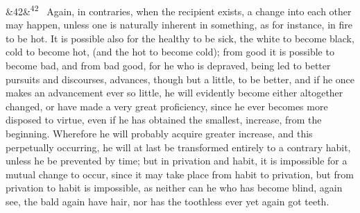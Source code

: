 \documentclass[12pt]{article}
\newcommand{\para}[1][]{\par\noindent\ifx&#1&\else\textsuperscript{\footnotesize #1}~\fi}
\begin{document}
\para[42] Again, in contraries, when the recipient exists, a change into each other may happen, unless one is naturally inherent in something, as for instance, in fire to be hot. It is possible also for the healthy to be sick, the white to become black, cold to become hot, (and the hot to become cold); from good it is possible to become bad, and from bad good, for he who is depraved, being led to better pursuits and discourses, advances, though but a little, to be better, and if he once makes an advancement ever so little, he will evidently become either altogether changed, or have made a very great proficiency, since he ever becomes more disposed to virtue, even if he has obtained the smallest, increase, from the beginning. Wherefore he will probably acquire greater increase, and this perpetually occurring, he will at last be transformed entirely to a contrary habit, unless he be prevented by time; but in privation and habit, it is impossible for a mutual change to occur, since it may take place from habit to privation, but from privation to habit is impossible, as neither can he who has become blind, again see, the bald again have hair, nor has the toothless ever yet again got teeth.
\end{document}
